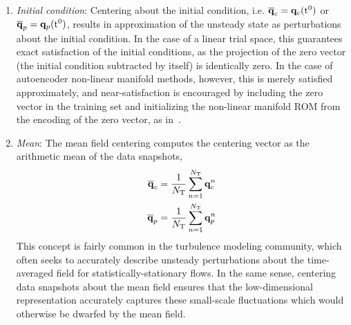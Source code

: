\begin{enumerate}
	\item \textit{Initial condition}: Centering about the initial condition, i.e. $\mathbf{\overline{q}}_{c} = \mathbf{q}_{c}(\text{t}^0)$ or $\mathbf{\overline{q}}_{p} = \mathbf{q}_{p}(\text{t}^0)$, results in approximation of the unsteady state as perturbations about the initial condition. In the case of a linear trial space, this guarantees exact satisfaction of the initial conditions, as the projection of the zero vector (the initial condition subtracted by itself) is identically zero. In the case of autoencoder non-linear manifold methods, however, this is merely satisfied approximately, and near-satisfaction is encouraged by including the zero vector in the training set and initializing the non-linear manifold ROM from the encoding of the zero vector, as in~\cite{Lee2020}.

	\item \textit{Mean}: The mean field centering computes the centering vector as the arithmetic mean of the data snapshots,
	\begin{align}
		\mathbf{\overline{q}}_{c} &= \frac{1}{N_{\text{T}}} \sum_{n=1}^{N_{\text{T}}} \mathbf{q}_{c}^{n} \label{eq:meanCentCons}\\
		\mathbf{\overline{q}}_{p} &= \frac{1}{N_{\text{T}}} \sum_{n=1}^{N_{\text{T}}} \mathbf{q}_{p}^{n} \label{eq:meanCentPrim}
	\end{align}
	This concept is fairly common in the turbulence modeling community, which often seeks to accurately describe unsteady perturbations about the time-averaged field for statistically-stationary flows. In the same sense, centering data snapshots about the mean field ensures that the low-dimensional representation accurately captures these small-scale fluctuations which would otherwise be dwarfed by the mean field.


\end{enumerate}
